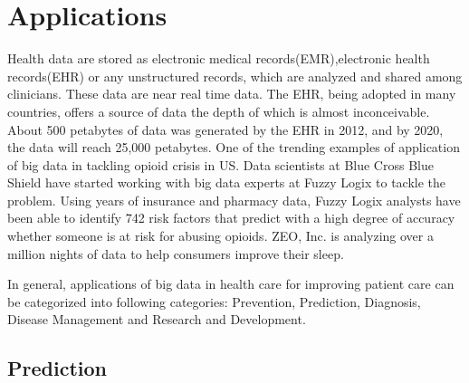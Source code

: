 \documentclass[sigconf]{acmart}
\begin{document}
\section{Applications}

Health data are stored as electronic medical records(EMR),electronic health records(EHR) or any unstructured records, which are 
analyzed and shared among clinicians. These data are near real time data. The EHR, being adopted in many countries, offers a source 
of data the depth of which is almost inconceivable. About 500 petabytes of data was generated by the EHR in 2012, and by 2020, the 
data will reach 25,000 petabytes\cite{www-ghdonline-org}. One of the trending examples of application of big data in tackling 
opioid crisis in US.
Data scientists at Blue Cross Blue Shield have started working with big data experts at Fuzzy Logix to tackle the problem. Using 
years of insurance and pharmacy data, Fuzzy Logix analysts have been able to identify 742 risk factors that predict with a high 
degree of accuracy whether someone is at risk for abusing opioids\cite{www-datapine-com}. ZEO, Inc. is analyzing over a million 
nights of data to help consumers improve their sleep\cite{www-ghdonline-org}.

In general, applications of big data in health care for improving patient care can be categorized into following categories: Prevention, Prediction, Diagnosis, Disease Management and Research and Development.

\subsection{Prediction}
\end{document}
